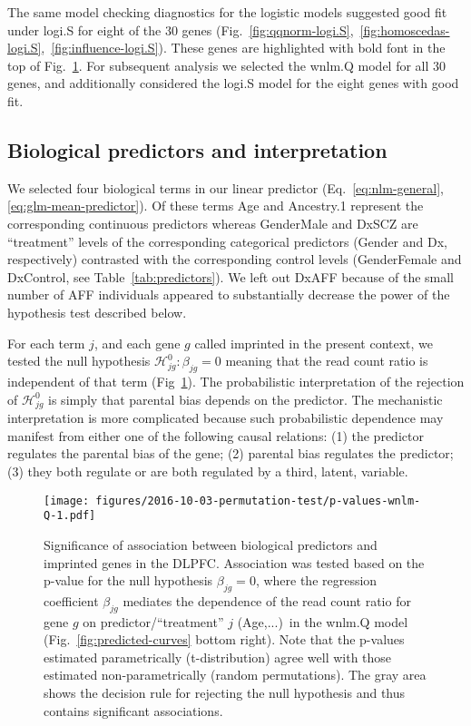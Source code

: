 \documentclass[letterpaper]{article}
\begin{document}
The same model checking diagnostics for the logistic models suggested good
fit under logi.S for eight of the 30 genes
(Fig.~\ref{fig:qqnorm-logi.S},~\ref{fig:homoscedas-logi.S},~\ref{fig:influence-logi.S}).
These genes are highlighted with bold font in the top of Fig.~\ref{fig:pval-wnlm.Q}.
For subsequent analysis we selected  the wnlm.Q model for all 30 genes, and
additionally considered the logi.S model for the eight
genes with good fit.

\subsection{Biological predictors and interpretation}

We selected four biological terms in our linear predictor
(Eq.~\ref{eq:nlm-general}, \ref{eq:glm-mean-predictor}).  Of these terms Age
and Ancestry.1 represent the corresponding continuous predictors whereas
GenderMale and DxSCZ are “treatment” levels of the corresponding categorical
predictors (Gender and Dx, respectively) contrasted with the corresponding
control levels (GenderFemale and DxControl, see Table~\ref{tab:predictors}).
We left out DxAFF because of the small number of AFF individuals appeared to
substantially decrease the power of the hypothesis test described below.

For each term \(j\), and each gene \(g\) called imprinted in the present
context, we tested the null hypothesis \(\mathcal{H}^0_{jg} : \beta_{jg} = 0\)
meaning that the read count ratio is independent of that term
(Fig~\ref{fig:pval-wnlm.Q}).  The probabilistic interpretation of the
rejection of \(\mathcal{H}^0_{jg}\) is simply that parental bias depends on
the predictor.  The mechanistic interpretation is more complicated because
such probabilistic dependence may manifest from either one of the following
causal relations: (1) the predictor regulates the parental bias of the gene;
(2) parental bias regulates the predictor; (3) they both regulate or are both
regulated by a third, latent, variable.

\begin{figure}
\begin{center}
\texttt{[image: figures/2016-10-03-permutation-test/p-values-wnlm-Q-1.pdf]}
\end{center}
\caption{
Significance of association between biological predictors and imprinted genes
in the DLPFC.  Association was tested based on the p-value for the null
hypothesis \(\beta_{jg}=0\), where the regression coefficient \(\beta_{jg}\)
mediates the dependence of the read count ratio for gene \(g\) on
predictor/``treatment'' \(j\) (Age,...)~in the wnlm.Q model
(Fig.~\ref{fig:predicted-curves} bottom right).  Note that the p-values
estimated parametrically (t-distribution) agree well with those estimated
non-parametrically (random permutations).  The gray area shows the decision
rule for rejecting the null hypothesis and thus contains significant
associations.
}
\label{fig:pval-wnlm.Q}
\end{figure}
\end{document}
